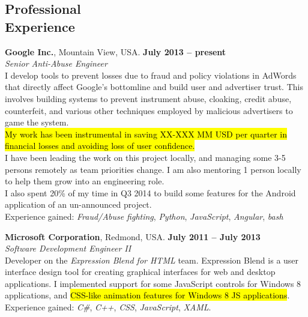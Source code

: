 \documentclass[margin,line]{resume}
\begin{document}
\begin{resume}
	\section{\mysidestyle Professional\\Experience}

	\textbf{Google Inc.}, Mountain View, USA. \hfill \textbf{July 2013 -- present}\vspace{2mm}\\\vspace{1mm}%
	\textsl{Senior Anti-Abuse Engineer}\\
    I develop tools to prevent losses due to fraud and policy violations in AdWords that directly affect Google's bottomline and build user and advertiser trust. This involves building systems to prevent instrument abuse, cloaking, credit abuse, counterfeit, and various other techniques employed by malicious advertisers to game the system.\\
    \hl{My work has been instrumental in saving XX-XXX MM USD per quarter in financial losses and avoiding loss of user confidence.}\\
    I have been leading the work on this project locally, and managing some 3-5 persons remotely as team priorities change.
    I am also mentoring 1 person locally to help them grow into an engineering role.\\
    I also spent 20\% of my time in Q3 2014 to build some features for the Android application of an un-announced project.\\
    Experience gained: \textit{Fraud/Abuse fighting}, \textit{Python}, \textit{JavaScript}, \textit{Angular}, \textit{bash}

    \textbf{Microsoft Corporation}, Redmond, USA. \hfill \textbf{July 2011 -- July 2013}\vspace{2mm}\\\vspace{1mm}%
	\textsl{Software Development Engineer II}\\
	Developer on the \textit{Expression Blend for HTML} team. Expression Blend is a user interface design tool for creating graphical interfaces for web and desktop applications. I implemented support for some JavaScript controls for Windows 8 applications, and \hl{CSS-like animation features for Windows 8 JS applications}.\\
	Experience gained: \textit{C\#}, \textit{C++}, \textit{CSS}, \textit{JavaScript}, \textit{XAML}.


\end{resume}
\end{document}
